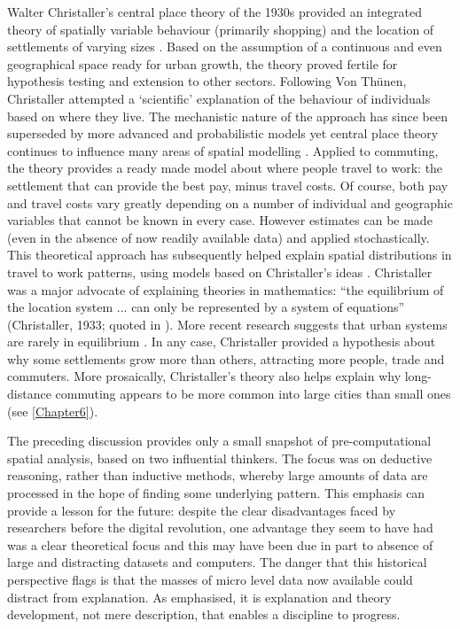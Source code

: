 Walter Christaller's central place theory of the 1930s provided an integrated
theory of spatially variable behaviour (primarily shopping) and the location of
settlements of varying sizes \citep{matthews2008geography}. Based on the
assumption of a continuous and even geographical space ready for urban growth,
the theory proved fertile for hypothesis testing and extension to other sectors.
Following Von Th\"{u}nen, Christaller
attempted a `scientific' explanation of the behaviour of individuals based on
where they live. The mechanistic nature of the approach has since been
superseded by more advanced and probabilistic models
yet central place theory continues to influence
many areas of spatial modelling \citep{Wilson1972-theoretical, Sonis2005,
Farooq2012-integreted}. Applied to commuting, the theory provides a ready made
model about where people travel to work: the settlement that can provide the
best pay, minus travel costs. Of course, both pay and travel costs vary greatly
depending on a number of individual and geographic variables that cannot be known
in every case. However estimates can be made (even in the absence of now
readily available data) and applied stochastically. 
This theoretical approach has subsequently helped
explain spatial distributions in travel to work patterns, using models based on
Christaller's ideas \citep{Tabuchi2006-commuting-costs}. Christaller was
a major advocate of explaining theories in
mathematics: ``the equilibrium of the location system ... can only be
represented by a system of equations'' (Christaller, 1933; quoted in
\citealp[p.~35]{Wilson1972-theoretical}).
More recent research suggests that urban systems are rarely in equilibrium
\citep{batty2007cities}. In any case, Christaller provided a hypothesis about
why some settlements grow more than others, attracting more people, trade and
commuters.
More prosaically, Christaller's theory also helps explain why
long-distance commuting appears to be more common into large cities than small ones
(see \cref{Chapter6}).

The preceding discussion provides only a small snapshot of pre-computational
spatial analysis, based on two influential thinkers. The
focus was on deductive reasoning, rather than inductive methods, whereby large
amounts of data are processed in the hope of finding some underlying pattern.
This emphasis can provide a lesson for the future: despite the clear
disadvantages faced by researchers before the digital revolution, one
advantage they seem to have had was a clear theoretical focus and this may
have been due in part to absence of large and distracting datasets and
computers.
The danger that this historical perspective flags is that the masses of
micro level data now available could distract from explanation. As
\citet{Wilson1972-theoretical} emphasised, it is explanation and theory
development, not mere description, that enables a discipline to progress. 

